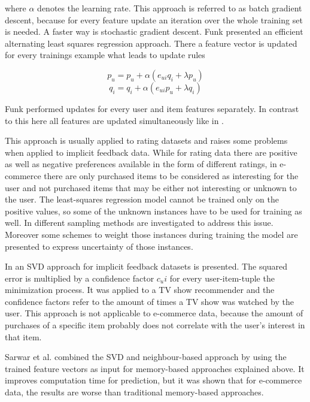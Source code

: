 \documentclass[10pt]{reportMaster}
\begin{document}
where $\alpha$ denotes the learning rate.
This approach is referred to as batch gradient descent, because for every feature update an iteration over the whole training set is needed.
A faster way is stochastic gradient descent.
Funk \cite{funkLeastSquares} presented an efficient alternating least squares regression approach.
There a feature vector is updated for every trainings example what leads to update rules 

\begin{equation}
	p_u = p_u + \alpha (e_{ui} q_i + \lambda p_u)
\end{equation}
\begin{equation}
	q_i = q_i + \alpha (e_{ui} p_u + \lambda q_i)
\end{equation}

Funk performed updates for every user and item features separately.
In contrast to this here all features are updated simultaneously like in \cite{matrixFactorizationDifRegParam}.

This approach is usually applied to rating datasets and raises some problems when applied to implicit feedback data.
While for rating data there are positive as well as negative preferences available in the form of different ratings, in e-commerce there are only purchased items to be considered as interesting for the user and not purchased items that may be either not interesting or unknown to the user.
The least-squares regression model cannot be trained only on the positive values, so some of the unknown instances have to be used for training as well.
In \cite{occf} different sampling methods are investigated to address this issue.
Moreover some schemes to weight those instances during training the model are presented to express uncertainty of those instances.

In \cite{CFForImplFeedback} an SVD approach for implicit feedback datasets is presented.
The squared error is multiplied by a confidence factor $c_ui$ for every user-item-tuple the minimization process.
It was applied to a TV show recommender and the confidence factors refer to the amount of times a TV show was watched by the user.
This approach is not applicable to e-commerce data, because the amount of purchases of a specific item probably does not correlate with the user's interest in that item.

Sarwar et al. \cite{nnOnSvd} combined the SVD and neighbour-based approach by using the trained feature vectors as input for memory-based approaches explained above.
It improves computation time for prediction, but it was shown that for e-commerce data, the results are worse than traditional memory-based approaches.
\end{document}
